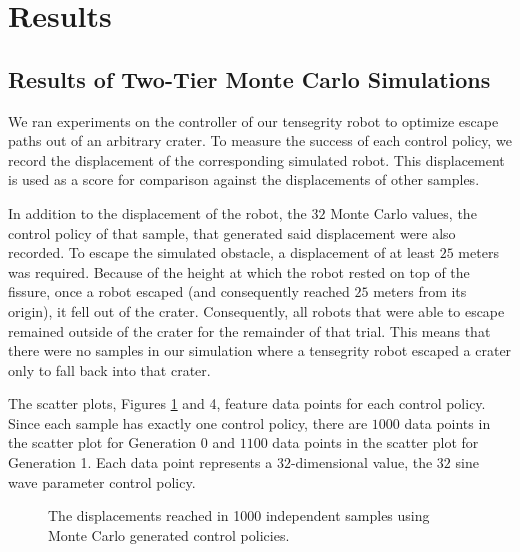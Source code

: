 \documentclass{llncs}
\begin{document}
\section{Results}
\subsection{Results of Two-Tier Monte Carlo Simulations}
\label{resultsSection} {
We ran experiments on the controller of our tensegrity robot to optimize escape paths out of an arbitrary crater.
To measure the success of each control policy, we record the displacement of the corresponding simulated robot.
This displacement is used as a score for comparison against the displacements of other samples.

In addition to the displacement of the robot, the $32$ Monte Carlo values, the control policy of that sample, that generated said displacement were also recorded.
To escape the simulated obstacle, a displacement of at least $25$ meters was required.
Because of the height at which the robot rested on top of the fissure, once a robot escaped (and consequently reached $25$ meters from its origin), it fell out of the crater.
Consequently, all robots that were able to escape remained outside of the crater for the remainder of that trial.
This means that there were no samples in our simulation where a tensegrity robot escaped a crater only to fall back into that crater.

The scatter plots, Figures \ref{gen0scatter} and 4, feature data points for each control policy.
Since each sample has exactly one control policy, there are $1000$ data points in the scatter plot for Generation 0 and $1100$ data points in the scatter plot for Generation 1.
Each data point represents a $32$-dimensional value, the $32$ sine wave parameter control policy.
                     
\label{resultsgen0} {
\begin{figure}
\label{gen0scatter}
\centering
{} 
\caption{The displacements reached in 1000 independent samples using Monte Carlo generated control policies.}
\end{figure}

}}
\end{document}
